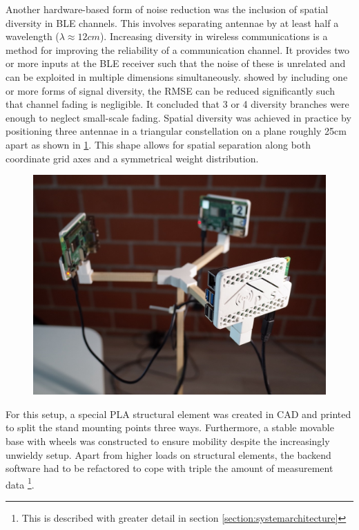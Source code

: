 \documentclass[a4paper, oneside]{ipsreport}
\begin{document}
Another hardware-based form of noise reduction was the inclusion of spatial diversity in BLE channels. This involves separating antennae by at least half a wavelength ($\lambda \approx 12cm$). Increasing diversity in wireless communications is a method for improving the reliability of a communication channel. It provides two or more inputs at the BLE receiver such that the noise of these is unrelated and can be exploited in multiple dimensions simultaneously. \autocite{AntennaDiversity} showed by including one or more forms of signal diversity, the RMSE can be reduced significantly such that channel fading is negligible. It concluded that 3 or 4 diversity branches were enough to neglect small-scale fading. Spatial diversity was achieved in practice by positioning three antennae in a triangular constellation on a plane roughly 25cm apart as shown in \ref{fig:multiclient}. This shape allows for spatial separation along both coordinate grid axes and a symmetrical weight distribution.

\begin{figure}[h]
	\centering
	\begin{minipage}{.75\textwidth}
		\centering
		\includegraphics[width=\linewidth]{./figures/multiclient.jpg}
		\label{fig:multiclient}
	\end{minipage}%
\end{figure}

For this setup, a special PLA structural element was created in CAD and printed to split the stand mounting points three ways. Furthermore, a stable movable base with wheels was constructed to ensure mobility despite the increasingly unwieldy setup. Apart from higher loads on structural elements, the backend software had to be refactored to cope with triple the amount of measurement data \footnote{This is described with greater detail in section \ref{section:systemarchitecture}}.
\end{document}

